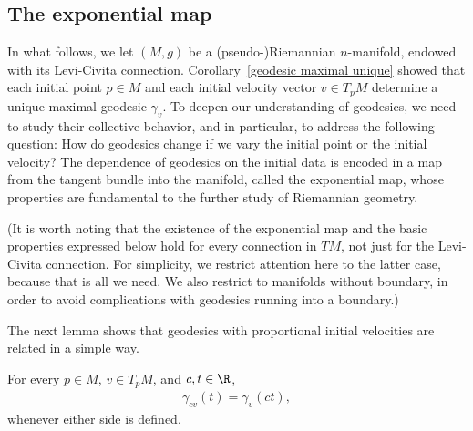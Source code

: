 \subsection{The exponential map}
In what follows, we let $(M,g)$ be a (pseudo-)Riemannian $n$-manifold, endowed with its Levi-Civita connection. Corollary~\ref{geodesic maximal unique} showed 
that each initial point $p\in M$ and each initial velocity vector $v\in T_pM$ determine a unique maximal geodesic $\gamma_v$. To deepen our understanding of geodesics, 
we need to study their collective behavior, and in particular, to address the following question: How do geodesics change if we vary the initial point or the initial 
velocity? The dependence of geodesics on the initial data is encoded in a map from the tangent bundle into the manifold, called the exponential map, whose properties 
are fundamental to the further study of Riemannian geometry.\par
(It is worth noting that the existence of the exponential map and the basic properties expressed below hold for every connection in $TM$, not just for the Levi-Civita 
connection. For simplicity, we restrict attention here to the latter case, because that is all we need. We also restrict to manifolds without boundary, in order to 
avoid complications with geodesics running into a boundary.)\par
The next lemma shows that geodesics with proportional initial velocities are related in a simple way.
\begin{lemma}
For every $p\in M$, $v\in T_pM$, and $c,t\in\R$,
\begin{align}\label{rescaling lemma-1}
\gamma_{cv}(t)=\gamma_v(ct),
\end{align}
whenever either side is defined.
\end{lemma}
